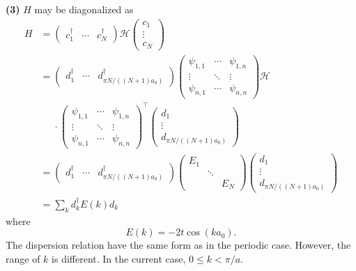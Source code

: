 \documentclass{article}
\makeatletter
\newcommand*{\shifttext}[1]{%
  \settowidth{\@tempdima}{#1}%
  \hspace{-\@tempdima}#1%
}
\newcommand{\plabel}[1]{%
\shifttext{\textbf{#1}\quad}%
}
\makeatother
\begin{document}
\plabel{(3)}%
$H$ may be diagonalized as
\begin{align*}
  H &= \begin{pmatrix}
    c^\dagger_1 & \cdots & c^\dagger_N
  \end{pmatrix} \mathcal{H} \begin{pmatrix}
    c_1 \\ \vdots \\ c_N
  \end{pmatrix} \\
  &= \begin{pmatrix}
    d^\dagger_1 & \cdots & d^\dagger_{\pi N / ((N+1)a_0)}
  \end{pmatrix} \begin{pmatrix}
    \psi_{1,1} & \cdots & \psi_{1,n} \\
    \vdots & \ddots & \vdots \\
    \psi_{n,1} & \cdots & \psi_{n,n}
  \end{pmatrix} \mathcal{H} \\
  &\phantom{{}={}} \cdot \begin{pmatrix}
    \psi_{1,1} & \cdots & \psi_{1,n} \\
    \vdots & \ddots & \vdots \\
    \psi_{n,1} & \cdots & \psi_{n,n}
  \end{pmatrix}^\intercal \begin{pmatrix}
    d_1 \\ \vdots \\ d_{\pi N / ((N+1)a_0)}
  \end{pmatrix} \\
  &= \begin{pmatrix}
    d^\dagger_1 & \cdots & d^\dagger_{\pi N / ((N+1)a_0)}
  \end{pmatrix} \begin{pmatrix}
    E_1 & & \\
    & \ddots & \\
    & & E_N
  \end{pmatrix} \begin{pmatrix}
    d_1 \\ \vdots \\ d_{\pi N / ((N+1)a_0)}
  \end{pmatrix} \\
  &= \sum_k d^\dagger_k E(k) d_k
\end{align*}
where
\[ E(k) = -2 t \cos (k a_0). \]
The dispersion relation have the same form as in the periodic case.
However, the range of $k$ is different.
In the current case, $0\le k < \pi/a$.
\end{document}
